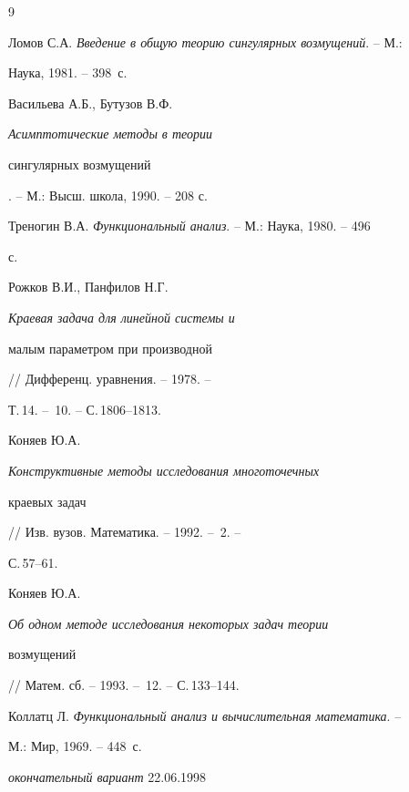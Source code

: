 \begin{thebibliography}{9} 


 




Ломов С.А. {\em Введение в общую теорию сингулярных возмущений}. -- М.: 


Наука, 1981. -- 398~с. 




Васильева А.Б., Бутузов В.Ф. {\em Асимптотические методы в теории 


сингулярных возмущений}. -- М.: Высш. школа, 1990. -- 208 с. 




Треногин В.А. {\em Функциональный анализ}. -- М.: Наука, 1980. -- 496 


с. 




Рожков В.И., Панфилов Н.Г. {\em Краевая задача для линейной системы и 


малым параметром при производной} // Дифференц. уравнения. -- 1978. -- 


Т.\,14. -- \No\,10. -- С.\,1806--1813. 




Коняев Ю.А. {\em Конструктивные методы исследования многоточечных 


краевых задач} // Изв. вузов. Математика. -- 1992. -- \No\,2. -- 


С.\,57--61. 




Коняев Ю.А. {\em Об одном методе исследования некоторых задач теории 


возмущений} // Матем. сб. -- 1993. -- \No\,12. -- С.\,133--144. 




Коллатц Л. {\em Функциональный анализ и вычислительная математика}. -- 


М.: Мир, 1969. -- 448~с. 


 


\end{thebibliography} 


 


\vskip 2cm 


 






% 


{{\it окончательный вариант} 22.06.1998} 




 


\label{end} 


 


